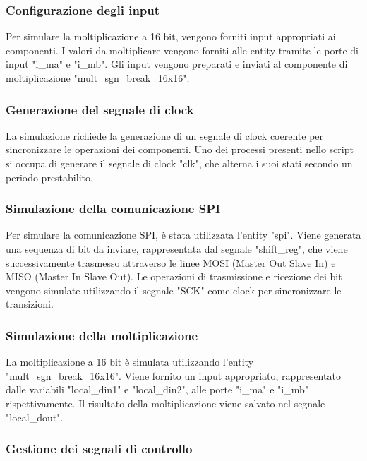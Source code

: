 \documentclass[titlepage]{report}
\begin{document}
			\subsubsection{Configurazione degli input}

				Per simulare la moltiplicazione a 16 bit, vengono forniti input appropriati ai componenti. I valori da moltiplicare vengono forniti alle entity tramite le porte di input "i\_ma" e "i\_mb". Gli input vengono preparati e inviati al componente di moltiplicazione "mult\_sgn\_break\_16x16".

			\subsubsection{Generazione del segnale di clock}

				La simulazione richiede la generazione di un segnale di clock coerente per sincronizzare le operazioni dei componenti. Uno dei processi presenti nello script si occupa di generare il segnale di clock "clk", che alterna i suoi stati secondo un periodo prestabilito.

			\subsubsection{Simulazione della comunicazione SPI}

				Per simulare la comunicazione SPI, è stata utilizzata l'entity "spi". Viene generata una sequenza di bit da inviare, rappresentata dal segnale "shift\_reg", che viene successivamente trasmesso attraverso le linee MOSI (Master Out Slave In) e MISO (Master In Slave Out). Le operazioni di trasmissione e ricezione dei bit vengono simulate utilizzando il segnale "SCK" come clock per sincronizzare le transizioni.

			\subsubsection{Simulazione della moltiplicazione}

				La moltiplicazione a 16 bit è simulata utilizzando l'entity "mult\_sgn\_break\_16x16". Viene fornito un input appropriato, rappresentato dalle variabili "local\_din1" e "local\_din2", alle porte "i\_ma" e "i\_mb" rispettivamente. Il risultato della moltiplicazione viene salvato nel segnale "local\_dout".

			\subsubsection{Gestione dei segnali di controllo}
\end{document}
